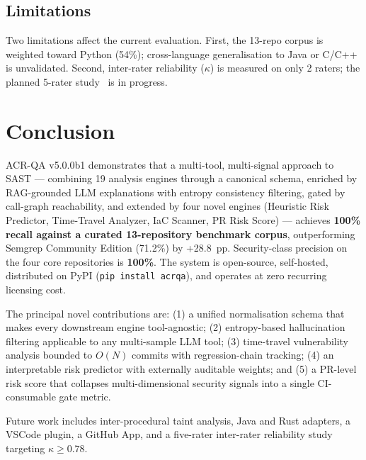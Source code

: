 \documentclass[conference]{IEEEtran}
\begin{document}
\subsection{Limitations}

Two limitations affect the current evaluation. First, the 13-repo corpus is weighted toward Python (54\%); cross-language generalisation to Java or C/C++ is unvalidated. Second, inter-rater reliability ($\kappa$) is measured on only 2 raters; the planned 5-rater study~\cite{fleiss1971measuring} is in progress.

\section{Conclusion}
\label{sec:conclusion}

ACR-QA v5.0.0b1 demonstrates that a multi-tool, multi-signal approach to SAST — combining 19 analysis engines through a canonical schema, enriched by RAG-grounded LLM explanations with entropy consistency filtering, gated by call-graph reachability, and extended by four novel engines (Heuristic Risk Predictor, Time-Travel Analyzer, IaC Scanner, PR Risk Score) — achieves \textbf{100\% recall against a curated 13-repository benchmark corpus}, outperforming Semgrep Community Edition (71.2\%) by +28.8~pp. Security-class precision on the four core repositories is \textbf{100\%}. The system is open-source, self-hosted, distributed on PyPI (\texttt{pip install acrqa}), and operates at zero recurring licensing cost.

The principal novel contributions are: (1) a unified normalisation schema that makes every downstream engine tool-agnostic; (2) entropy-based hallucination filtering applicable to any multi-sample LLM tool; (3) time-travel vulnerability analysis bounded to $O(N)$ commits with regression-chain tracking; (4) an interpretable risk predictor with externally auditable weights; and (5) a PR-level risk score that collapses multi-dimensional security signals into a single CI-consumable gate metric.

Future work includes inter-procedural taint analysis, Java and Rust adapters, a VSCode plugin, a GitHub App, and a five-rater inter-rater reliability study targeting $\kappa \geq 0.78$.



\end{document}

